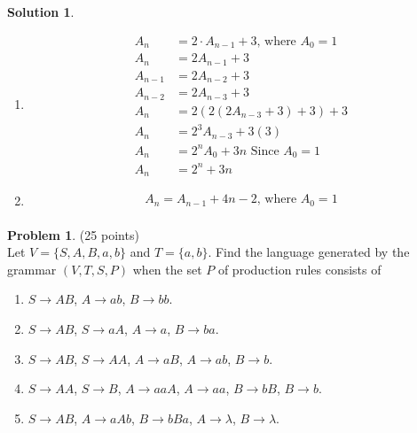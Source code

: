 \documentclass{article}
\theoremstyle{definition}
\newtheorem{problem}{Problem}
\newtheorem*{solution}{Solution}
\begin{document}
\begin{solution}\ \\
  \begin{enumerate}
    \item
    \begin{equation*}
      \begin{aligned}
            A_n &= 2\cdot A_{n-1} + 3 \text{, where } A_0 = 1 \\
            A_n &= 2A_{n-1} + 3 \\
        A_{n-1} &= 2A_{n-2} + 3 \\
        A_{n-2} &= 2A_{n-3} + 3 \\
            A_n &= 2(2(2A_{n-3} + 3) + 3) + 3 \\
            A_n &= 2^{3}A_{n-3} + 3(3) \\
            A_n &= 2^{n}A_{0} + 3n \text{ Since $A_0 = 1$} \\
            A_n &= 2^{n} + 3n
      \end{aligned}
    \end{equation*}

  \item
  \begin{equation*}
    \begin{aligned}
      A_n = A_{n-1} + 4n - 2\text{, where } A_0 = 1 \\
    \end{aligned}
  \end{equation*}
\end{enumerate}
\end{solution}

\newpage

\begin{problem} (25 points)\\
Let $V=\{S,A,B,a,b\}$ and $T=\{a,b\}$.  Find the language generated by the grammar $(V,T,S,P)$ when the set $P$ of production rules consists of
\begin{enumerate}
  \item $S\to AB$, $A \to ab$, $B\to bb$.
  \item $S \to AB$, $S \to aA$, $A \to a$, $B \to ba$.
  \item $S \to AB$, $S \to AA$, $A\to aB$, $A\to ab$, $B\to b$.
  \item $S \to AA$, $S \to B$, $A \to aaA$, $A \to aa$, $B \to bB$, $B \to b$.
  \item $S \to AB$, $A \to aAb$, $B \to bBa$, $A \to \lambda$, $B \to \lambda$.
\end{enumerate}
\end{problem}
\end{document}
